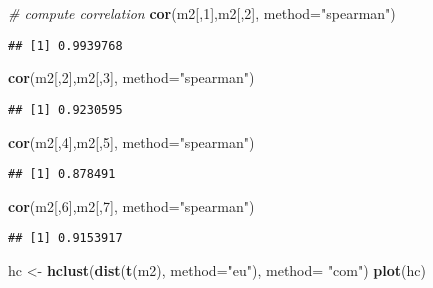 \documentclass[]{article}
\newenvironment{Shaded}{\begin{snugshade}}{\end{snugshade}}
\newcommand{\KeywordTok}[1]{\textcolor[rgb]{0.13,0.29,0.53}{\textbf{#1}}}
\newcommand{\DataTypeTok}[1]{\textcolor[rgb]{0.13,0.29,0.53}{#1}}
\newcommand{\DecValTok}[1]{\textcolor[rgb]{0.00,0.00,0.81}{#1}}
\newcommand{\StringTok}[1]{\textcolor[rgb]{0.31,0.60,0.02}{#1}}
\newcommand{\CommentTok}[1]{\textcolor[rgb]{0.56,0.35,0.01}{\textit{#1}}}
\newcommand{\NormalTok}[1]{#1}
\begin{document}
\begin{Shaded}
\begin{Highlighting}[]
\CommentTok{# compute correlation}
\KeywordTok{cor}\NormalTok{(m2[,}\DecValTok{1}\NormalTok{],m2[,}\DecValTok{2}\NormalTok{], }\DataTypeTok{method=}\StringTok{"spearman"}\NormalTok{)}
\end{Highlighting}
\end{Shaded}

\begin{verbatim}
## [1] 0.9939768
\end{verbatim}

\begin{Shaded}
\begin{Highlighting}[]
\KeywordTok{cor}\NormalTok{(m2[,}\DecValTok{2}\NormalTok{],m2[,}\DecValTok{3}\NormalTok{], }\DataTypeTok{method=}\StringTok{"spearman"}\NormalTok{)}
\end{Highlighting}
\end{Shaded}

\begin{verbatim}
## [1] 0.9230595
\end{verbatim}

\begin{Shaded}
\begin{Highlighting}[]
\KeywordTok{cor}\NormalTok{(m2[,}\DecValTok{4}\NormalTok{],m2[,}\DecValTok{5}\NormalTok{], }\DataTypeTok{method=}\StringTok{"spearman"}\NormalTok{)}
\end{Highlighting}
\end{Shaded}

\begin{verbatim}
## [1] 0.878491
\end{verbatim}

\begin{Shaded}
\begin{Highlighting}[]
\KeywordTok{cor}\NormalTok{(m2[,}\DecValTok{6}\NormalTok{],m2[,}\DecValTok{7}\NormalTok{], }\DataTypeTok{method=}\StringTok{"spearman"}\NormalTok{)}
\end{Highlighting}
\end{Shaded}

\begin{verbatim}
## [1] 0.9153917
\end{verbatim}

\begin{Shaded}
\begin{Highlighting}[]
\NormalTok{hc <-}\StringTok{ }\KeywordTok{hclust}\NormalTok{(}\KeywordTok{dist}\NormalTok{(}\KeywordTok{t}\NormalTok{(m2), }\DataTypeTok{method=}\StringTok{"eu"}\NormalTok{), }\DataTypeTok{method=} \StringTok{"com"}\NormalTok{)}
\KeywordTok{plot}\NormalTok{(hc)}
\end{Highlighting}
\end{Shaded}
\end{document}
